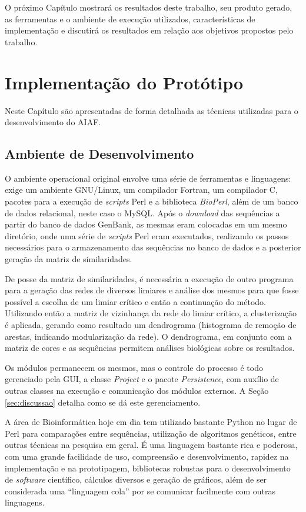 O próximo Capítulo mostrará os resultados deste trabalho, seu produto gerado, as ferramentas e o ambiente de execução utilizados, características
de implementação e discutirá os resultados em relação aos objetivos propostos pelo trabalho.

\chapter{Implementação do Protótipo}
\label{cap:resultados}

Neste Capítulo são apresentadas de forma detalhada as técnicas utilizadas para o desenvolvimento do AIAF.


\section{Ambiente de Desenvolvimento} \label{sec:ambiente}

O ambiente operacional original
envolve uma série de ferramentas e linguagens: exige um ambiente GNU/Linux, um compilador Fortran, um compilador C, pacotes para
a execução de \textit{scripts} Perl e a biblioteca \textit{BioPerl}, além de um banco de dados relacional, neste caso o MySQL. Após o \textit{download} das
sequências a partir do banco de dados GenBank, as mesmas eram colocadas em um mesmo diretório, onde uma série de \textit{scripts} Perl eram executados,
realizando os passos necessários para o armazenamento das sequências no banco de dados e a posterior geração da matriz de similaridades.

De posse da matriz de similaridades, é necessária a execução de outro programa para a geração das redes de diversos limiares e análise dos mesmos para que
fosse possível a escolha de um limiar crítico e então a continuação do método.
Utilizando então a matriz de vizinhança da rede do limiar crítico, a clusterização é aplicada, gerando como
resultado um dendrograma (histograma de remoção de arestas, indicando modularização da rede). O dendrograma, em conjunto com a matriz de cores e as sequências
permitem análises biológicas sobre os resultados.

Os módulos permanecem os mesmos, mas o controle do processo é todo gerenciado pela GUI, a classe \textit{Project} e o pacote \textit{Persistence},
com auxílio de
outras classes na execução e comunicação dos módulos externos. A Seção \ref{sec:discussao} detalha como se dá este gerenciamento.

A área de Bioinformática hoje em dia tem utilizado bastante Python \cite{python} no lugar de Perl para comparações entre sequências, utilização de algoritmos
genéticos, entre outras técnicas na pesquisa em geral. É uma linguagem bastante rica e poderosa, com uma grande facilidade de uso, compreensão e
desenvolvimento, rapidez na implementação e na prototipagem, bibliotecas robustas para o desenvolvimento de \textit{software} científico, cálculos
diversos e geração de gráficos, além de ser considerada uma ``linguagem cola'' por se comunicar facilmente com outras linguagens.


